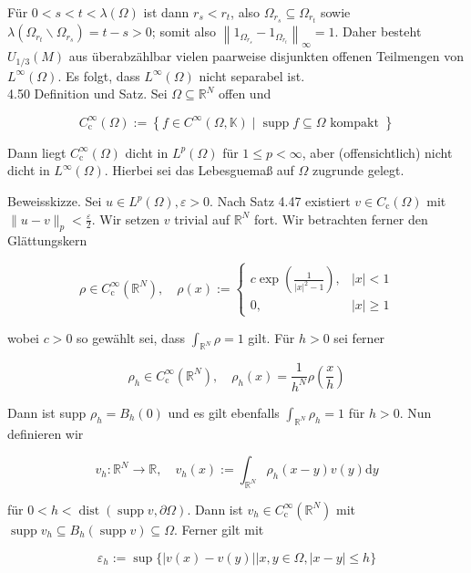 \documentclass[10pt, letterpaper]{article}
\begin{document}
Für $0<s<t<\lambda(\Omega)$ ist dann $r_{s}<r_{t}$, also $\Omega_{r_{s}} \subseteq \Omega_{r_{t}}$ sowie $\lambda\left(\Omega_{r_{t}} \backslash \Omega_{r_{s}}\right)=t-s>0$; somit also $\left\|1_{\Omega_{r_{s}}}-1_{\Omega_{r_{t}}}\right\|_{\infty}=1$. Daher besteht $U_{1 / 3}(M)$ aus überabzählbar vielen paarweise disjunkten offenen Teilmengen von $L^{\infty}(\Omega)$. Es folgt, dass $L^{\infty}(\Omega)$ nicht separabel ist.\\
4.50 Definition und Satz. Sei $\Omega \subseteq \mathbb{R}^{N}$ offen und

$$
C_{\mathrm{c}}^{\infty}(\Omega):=\left\{f \in C^{\infty}(\Omega, \mathbb{K}) \mid \operatorname{supp} f \subseteq \Omega \text { kompakt }\right\}
$$

Dann liegt $C_{\mathrm{c}}^{\infty}(\Omega)$ dicht in $L^{p}(\Omega)$ für $1 \leq p<\infty$, aber (offensichtlich) nicht dicht in $L^{\infty}(\Omega)$. Hierbei sei das Lebesguemaß auf $\Omega$ zugrunde gelegt.

Beweisskizze. Sei $u \in L^{p}(\Omega), \varepsilon>0$. Nach Satz 4.47 existiert $v \in C_{\mathrm{c}}(\Omega)$ mit $\|u-v\|_{p}<\frac{\varepsilon}{2}$. Wir setzen $v$ trivial auf $\mathbb{R}^{N}$ fort. Wir betrachten ferner den Glättungskern

$$
\rho \in C_{\mathrm{c}}^{\infty}\left(\mathbb{R}^{N}\right), \quad \rho(x):= \begin{cases}c \exp \left(\frac{1}{|x|^{2}-1}\right), & |x|<1 \\ 0, & |x| \geq 1\end{cases}
$$

wobei $c>0$ so gewählt sei, dass $\int_{\mathbb{R}^{N}} \rho=1$ gilt. Für $h>0$ sei ferner

$$
\rho_{h} \in C_{\mathrm{c}}^{\infty}\left(\mathbb{R}^{N}\right), \quad \rho_{h}(x)=\frac{1}{h^{N}} \rho\left(\frac{x}{h}\right)
$$

Dann ist supp $\rho_{h}=B_{h}(0)$ und es gilt ebenfalls $\int_{\mathbb{R}^{N}} \rho_{h}=1$ für $h>0$. Nun definieren wir

$$
v_{h}: \mathbb{R}^{N} \rightarrow \mathbb{R}, \quad v_{h}(x):=\int_{\mathbb{R}^{N}} \rho_{h}(x-y) v(y) \mathrm{d} y
$$

für $0<h<\operatorname{dist}(\operatorname{supp} v, \partial \Omega)$. Dann ist $v_{h} \in C_{\mathrm{c}}^{\infty}\left(\mathbb{R}^{N}\right)$ mit $\operatorname{supp} v_{h} \subseteq B_{h}(\operatorname{supp} v) \subseteq \Omega$. Ferner gilt mit

$$
\varepsilon_{h}:=\sup \{|v(x)-v(y)||x, y \in \Omega,|x-y| \leq h\}
$$
\end{document}
